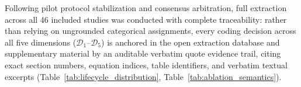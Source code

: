 Following pilot protocol stabilization and consensus arbitration, full extraction across all 46 included studies was conducted with complete traceability: rather than relying on ungrounded categorical assignments, every coding decision across all five dimensions ($\mathcal{D}_1$--$\mathcal{D}_5$) is anchored in the open extraction database and supplementary material by an auditable verbatim quote evidence trail, citing exact section numbers, equation indices, table identifiers, and verbatim textual excerpts (Table~\ref{tab:lifecycle_distribution}, Table~\ref{tab:ablation_semantics}).
